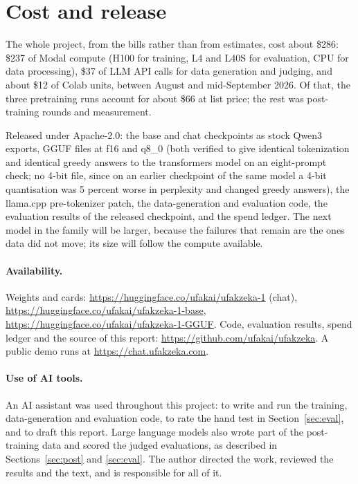 \documentclass[11pt]{article}
\begin{document}
\section{Cost and release}\label{sec:cost}
The whole project, from the bills rather than from estimates, cost about \$286: \$237 of Modal compute (H100 for training, L4 and L40S for evaluation, CPU for data processing), \$37 of LLM API calls for data generation and judging, and about \$12 of Colab units, between August and mid-September 2026. Of that, the three pretraining runs account for about \$66 at list price; the rest was post-training rounds and measurement.

Released under Apache-2.0: the base and chat checkpoints as stock Qwen3 exports, GGUF files at f16 and q8\_0 (both verified to give identical tokenization and identical greedy answers to the transformers model on an eight-prompt check; no 4-bit file, since on an earlier checkpoint of the same model a 4-bit quantisation was 5 percent worse in perplexity and changed greedy answers), the llama.cpp pre-tokenizer patch, the data-generation and evaluation code, the evaluation results of the released checkpoint, and the spend ledger. The next model in the family will be larger, because the failures that remain are the ones data did not move; its size will follow the compute available.

\paragraph{Availability.} Weights and cards: \url{https://huggingface.co/ufakai/ufakzeka-1} (chat), \url{https://huggingface.co/ufakai/ufakzeka-1-base}, \url{https://huggingface.co/ufakai/ufakzeka-1-GGUF}. Code, evaluation results, spend ledger and the source of this report: \url{https://github.com/ufakai/ufakzeka}. A public demo runs at \url{https://chat.ufakzeka.com}.

\paragraph{Use of AI tools.} An AI assistant was used throughout this project: to write and run the training, data-generation and evaluation code, to rate the hand test in Section~\ref{sec:eval}, and to draft this report. Large language models also wrote part of the post-training data and scored the judged evaluations, as described in Sections~\ref{sec:post} and \ref{sec:eval}. The author directed the work, reviewed the results and the text, and is responsible for all of it.
\end{document}
